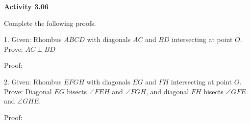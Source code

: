 \vspace{0.3ex}
\noindent\textbf{Activity 3.06}

\vspace{0.2ex}

\noindent Complete the following proofs.

\noindent \begin{minipage}[c]{0.35\textwidth}
1. Given: Rhombus \(ABCD\) with diagonals \(AC\) and \(BD\) intersecting at point \(O\).\\
Prove: \(AC \perp BD\)
\end{minipage}
\begin{minipage}[c]{0.14\textwidth}

\end{minipage}

\nextcolumn
\noindent Proof:

\vspace{-.1ex}
\noindent \begin{minipage}[c]{0.49\textwidth}
  
\end{minipage}


\noindent \begin{minipage}[c]{0.35\textwidth}
2. Given: Rhombus \(EFGH\) with diagonals \(EG\) and \(FH\) intersecting at point \(O\).\\
Prove: Diagonal \(EG\) bisects \(\angle FEH\) and \(\angle FGH\), and diagonal \(FH\) bisects \(\angle GFE\) and \(\angle GHE\).

\end{minipage}
\begin{minipage}[c]{0.14\textwidth}

\end{minipage}

\noindent Proof:

\vspace{-.1ex}
\noindent \begin{minipage}[c]{0.49\textwidth}
  
\end{minipage}
